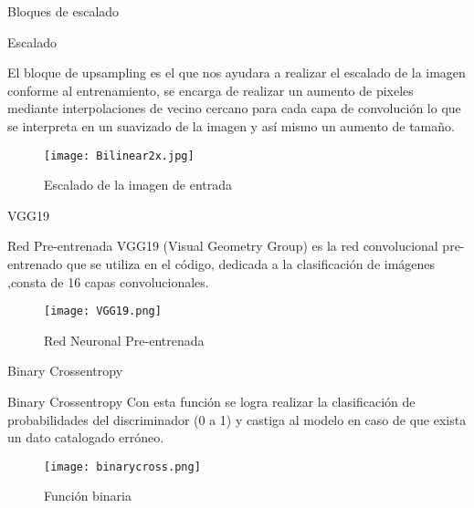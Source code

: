 \begin{frame}{Bloques de escalado}
    \begin{block}{Escalado}
        
        El bloque de upsampling es el que nos ayudara a realizar el escalado de la imagen conforme al entrenamiento,
        se encarga de realizar un aumento de pixeles mediante interpolaciones de vecino cercano para cada 
        capa de convolución lo que se interpreta en un suavizado de la imagen y así mismo un aumento de tamaño.
    \end{block}
    \begin{figure}[H]
        \begin{center}
          \texttt{[image: Bilinear2x.jpg]}
          \caption{Escalado de la imagen de entrada}
          \label{Alexis11}
        \end{center}
    \end{figure}
     
\end{frame}

\begin{frame}{VGG19}
    
\begin{block}{Red Pre-entrenada}
    VGG19 (Visual Geometry Group) es la red convolucional pre-entrenado que se utiliza en el código,
    dedicada a la clasificación de imágenes ,consta de 16 capas convolucionales.
\end{block}
    \begin{figure}[H]
        \begin{center}
          \texttt{[image: VGG19.png]}
          \caption{Red Neuronal Pre-entrenada}
          \label{Alexis12}
        \end{center}
    \end{figure}
     

\end{frame}

\begin{frame}{Binary Crossentropy}
\begin{block}{Binary Crossentropy}
    Con esta función se logra realizar la clasificación de probabilidades del discriminador
    (0 a 1) y castiga al modelo en caso de que exista un dato catalogado erróneo.
\end{block}
    \begin{figure}[H]
        \begin{center}
          \texttt{[image: binarycross.png]}
          \caption{Función binaria}
          \label{Alexis12}
        \end{center}
    \end{figure}
     

\end{frame}

